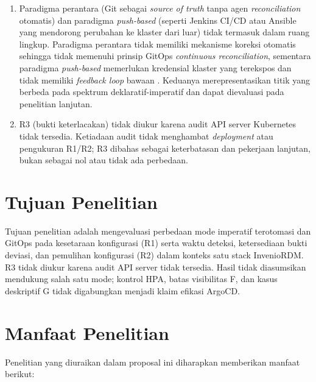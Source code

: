 \begin{enumerate}
  \item Paradigma perantara (Git sebagai \textit{source of truth} tanpa agen \textit{reconciliation} otomatis) dan paradigma \textit{push-based} (seperti Jenkins CI/CD atau Ansible yang mendorong perubahan ke klaster dari luar) tidak termasuk dalam ruang lingkup. Paradigma perantara tidak memiliki mekanisme koreksi otomatis sehingga tidak memenuhi prinsip GitOps \textit{continuous reconciliation}, sementara paradigma \textit{push-based} memerlukan kredensial klaster yang terekspos dan tidak memiliki \textit{feedback loop} bawaan \citep{utami2021analysis, shrestha2024configuration}. Keduanya merepresentasikan titik yang berbeda pada spektrum deklaratif-imperatif dan dapat dievaluasi pada penelitian lanjutan.

  \item R3 (bukti keterlacakan) tidak diukur karena audit API server Kubernetes tidak tersedia. Ketiadaan audit tidak menghambat \textit{deployment} atau pengukuran R1/R2; R3 dibahas sebagai keterbatasan dan pekerjaan lanjutan, bukan sebagai nol atau tidak ada perbedaan.
\end{enumerate}

\section{Tujuan Penelitian}

Tujuan penelitian adalah mengevaluasi perbedaan mode imperatif terotomasi dan GitOps pada kesetaraan konfigurasi (R1) serta waktu deteksi, ketersediaan bukti deviasi, dan pemulihan konfigurasi (R2) dalam konteks satu stack InvenioRDM. R3 tidak diukur karena audit API server tidak tersedia. Hasil tidak diasumsikan mendukung salah satu mode; kontrol HPA, batas visibilitas F, dan kasus deskriptif G tidak digabungkan menjadi klaim efikasi ArgoCD.

\section{Manfaat Penelitian}

Penelitian yang diuraikan dalam proposal ini diharapkan memberikan manfaat berikut:

